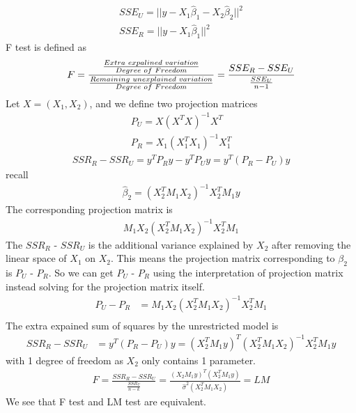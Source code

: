 \documentclass[a4paper]{article}
\begin{document}
\begin{align*}
SSE_U = ||y -X_1\hat\beta_1 - X_2\hat\beta_2||^2\\
SSE_R = ||y -X_1\hat\beta_1 ||^2
\end{align*}
F test is defined as
\begin{align*}
F = \frac{\frac{Extra \hspace{1mm} expalined \hspace{1mm} variation}{Degree \hspace{1mm} of \hspace{1mm} Freedom}}{\frac{Remaining \hspace{1mm}  unexplained \hspace{1mm} variation}{Degree \hspace{1mm} of \hspace{1mm} Freedom}} = \frac{SSE_R - SSE_U}{\frac{SSE_U}{n-1}}
\end{align*}
Let $X=(X_1, X_2)$, and we define two projection matrices
\begin{align*}
P_U = X(X^TX)^{-1}X^T\\
P_R = X_1(X_1^TX_1)^{-1}X_1^T
\end{align*}
\begin{align*}
SSR_R-SSR_U=y^TP_Ry-y^TP_Uy = y^T(P_R-P_U)y
\end{align*}
recall
\begin{align*}
\hat \beta_2 = (X_2^T M_1 X_2)^{-1}X_2^TM_1 y
\end{align*}
The corresponding projection matrix is
\begin{align*}
M_1X_2 (X_2^T M_1 X_2)^{-1}X_2^TM_1
\end{align*}
The $SSR_R$ - $SSR_U$ is the additional variance explained by $X_2$ after removing the linear space of $X_1$ on $X_2$.  This means the projection matrix corresponding to $\beta_2$ is $P_U$ - $P_R$. So we can get $P_U$ - $P_R$ using the interpretation of projection matrix instead solving for the projection matrix itself.
\begin{align*}
P_U-P_R & =M_1X_2(X_2^TM_1X_2)^{-1}X_2^TM_1\\
\end{align*}
The extra expained sum of squares by the unrestricted model is
\begin{align*}
SSR_R-SSR_U & = y^T(P_R-P_U)y = (X_2^TM_1y)^T(X_2^TM_1X_2)^{-1}X_2^TM_1y
\end{align*}
with 1 degree of freedom as $X_2$ only contains 1 parameter.
\begin{align*}
F = \frac{SSR_R - SSR_U}{\frac{SSR_U}{n-k}} = \frac{(X_2M_1y)^T(X_2^TM_1y)}{\hat \sigma^2 (X_2^TM_1X_2)} =LM
\end{align*}
We see that F test and LM test are equivalent.
\end{document}
